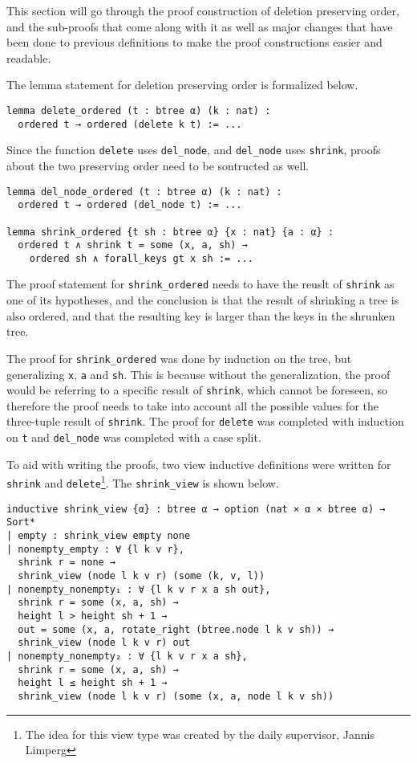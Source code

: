 This section will go through the proof construction of deletion preserving order, and the sub-proofs that come along with it as well as major changes that have been done to previous definitions to make the proof constructions easier and readable.

The lemma statement for deletion preserving order is formalized below.

\begin{lstlisting}
lemma delete_ordered (t : btree α) (k : nat) :
  ordered t → ordered (delete k t) := ...
\end{lstlisting}

Since the function \lstinline{delete} uses \lstinline{del_node}, and \lstinline{del_node} uses \lstinline{shrink}, proofs about the two preserving order need to be sontructed as well.

\begin{lstlisting}
lemma del_node_ordered (t : btree α) (k : nat) :
  ordered t → ordered (del_node t) := ...

lemma shrink_ordered {t sh : btree α} {x : nat} {a : α} :
  ordered t ∧ shrink t = some (x, a, sh) →
    ordered sh ∧ forall_keys gt x sh := ...
\end{lstlisting}

The proof statement for \lstinline{shrink_ordered} needs to have the reuslt of \lstinline{shrink} as one of its hypotheses, and the conclusion is that the result of shrinking a tree is also ordered, and that the resulting key is larger than the keys in the shrunken tree.

The proof for \lstinline{shrink_ordered} was done by induction on the tree, but generalizing \lstinline{x}, \lstinline{a} and \lstinline{sh}. This is because without the generalization, the proof would be referring to a specific result of \lstinline{shrink}, which cannot be foreseen, so therefore the proof needs to take into account all the possible values for the three-tuple result of \lstinline{shrink}. The proof for \lstinline{delete} was completed with induction on \lstinline{t} and \lstinline{del_node} was completed with a case split.

To aid with writing the proofs, two view inductive definitions were written for \lstinline{shrink} and \lstinline{delete}\footnote{The idea for this view type was created by the daily supervisor, Jannis Limperg}. The \lstinline{shrink_view} is shown below.

\begin{lstlisting}
inductive shrink_view {α} : btree α → option (nat × α × btree α) → Sort*
| empty : shrink_view empty none
| nonempty_empty : ∀ {l k v r},
  shrink r = none →
  shrink_view (node l k v r) (some (k, v, l))
| nonempty_nonempty₁ : ∀ {l k v r x a sh out},
  shrink r = some (x, a, sh) →
  height l > height sh + 1 →
  out = some (x, a, rotate_right (btree.node l k v sh)) →
  shrink_view (node l k v r) out
| nonempty_nonempty₂ : ∀ {l k v r x a sh},
  shrink r = some (x, a, sh) →
  height l ≤ height sh + 1 →
  shrink_view (node l k v r) (some (x, a, node l k v sh))
\end{lstlisting}

